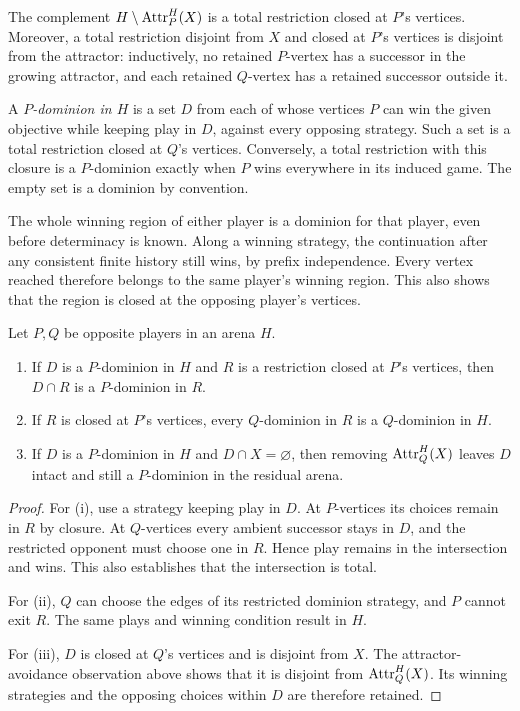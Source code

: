 The complement $H\setminus\operatorname{Attr}_P^H(X)$ is a total restriction
closed at $P$'s vertices. Moreover, a total restriction disjoint from
$X$ and closed at $P$'s vertices is disjoint from the attractor:
inductively, no retained $P$-vertex has a successor in the growing
attractor, and each retained $Q$-vertex has a retained successor
outside it.

A \emph{$P$-dominion in $H$} is a set $D$ from each of whose vertices
$P$ can win the given objective while keeping play in $D$, against
every opposing strategy. Such a set is a total restriction closed
at $Q$'s vertices. Conversely, a total restriction with this closure
is a $P$-dominion exactly when $P$ wins everywhere in its induced
game. The empty set is a dominion by convention.

The whole winning region of either player is a dominion for that
player, even before determinacy is known. Along a winning strategy,
the continuation after any consistent finite history still wins,
by prefix independence. Every vertex reached therefore belongs to
the same player's winning region. This also shows that the region
is closed at the opposing player's vertices.

\begin{lemma}\label{lem:arena-facts}
Let $P,Q$ be opposite players in an arena $H$.
\begin{enumerate}
\renewcommand{\labelenumi}{\textup{(\roman{enumi})}}
 \item If $D$ is a $P$-dominion in $H$ and $R$ is a restriction
 closed at $P$'s vertices, then $D\cap R$ is a $P$-dominion in $R$.
 \item If $R$ is closed at $P$'s vertices, every $Q$-dominion in
 $R$ is a $Q$-dominion in $H$.
 \item If $D$ is a $P$-dominion in $H$ and $D\cap X=\varnothing$,
 then removing $\operatorname{Attr}_Q^H(X)$ leaves $D$ intact and still a
 $P$-dominion in the residual arena.
\end{enumerate}
\end{lemma}

\begin{proof}
For \textup{(i)}, use a strategy keeping play in $D$. At $P$-vertices
its choices remain in $R$ by closure. At $Q$-vertices every ambient
successor stays in $D$, and the restricted opponent must choose one
in $R$. Hence play remains in the intersection and wins. This also
establishes that the intersection is total.

For \textup{(ii)}, $Q$ can choose the edges of its restricted
dominion strategy, and $P$ cannot exit $R$. The same plays and
winning condition result in $H$.

For \textup{(iii)}, $D$ is closed at $Q$'s vertices and is disjoint
from $X$. The attractor-avoidance observation above shows that it is
disjoint from $\operatorname{Attr}_Q^H(X)$. Its winning strategies and the opposing
choices within $D$ are therefore retained.
\end{proof}
